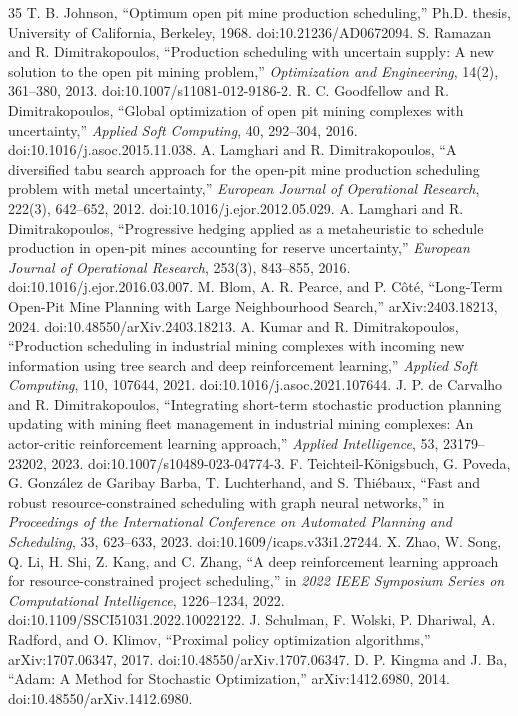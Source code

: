 \documentclass[11pt]{article}
\begin{document}
\begin{thebibliography}{35}
 T. B. Johnson, ``Optimum open pit mine production scheduling,'' Ph.D. thesis, University of California, Berkeley, 1968. doi:10.21236/AD0672094.
 S. Ramazan and R. Dimitrakopoulos, ``Production scheduling with uncertain supply: A new solution to the open pit mining problem,'' \emph{Optimization and Engineering}, 14(2), 361--380, 2013. doi:10.1007/s11081-012-9186-2.
 R. C. Goodfellow and R. Dimitrakopoulos, ``Global optimization of open pit mining complexes with uncertainty,'' \emph{Applied Soft Computing}, 40, 292--304, 2016. doi:10.1016/j.asoc.2015.11.038.
 A. Lamghari and R. Dimitrakopoulos, ``A diversified tabu search approach for the open-pit mine production scheduling problem with metal uncertainty,'' \emph{European Journal of Operational Research}, 222(3), 642--652, 2012. doi:10.1016/j.ejor.2012.05.029.
 A. Lamghari and R. Dimitrakopoulos, ``Progressive hedging applied as a metaheuristic to schedule production in open-pit mines accounting for reserve uncertainty,'' \emph{European Journal of Operational Research}, 253(3), 843--855, 2016. doi:10.1016/j.ejor.2016.03.007.
 M. Blom, A. R. Pearce, and P. C\^ot\'e, ``Long-Term Open-Pit Mine Planning with Large Neighbourhood Search,'' arXiv:2403.18213, 2024. doi:10.48550/arXiv.2403.18213.
 A. Kumar and R. Dimitrakopoulos, ``Production scheduling in industrial mining complexes with incoming new information using tree search and deep reinforcement learning,'' \emph{Applied Soft Computing}, 110, 107644, 2021. doi:10.1016/j.asoc.2021.107644.
 J. P. de Carvalho and R. Dimitrakopoulos, ``Integrating short-term stochastic production planning updating with mining fleet management in industrial mining complexes: An actor-critic reinforcement learning approach,'' \emph{Applied Intelligence}, 53, 23179--23202, 2023. doi:10.1007/s10489-023-04774-3.
 F. Teichteil-K\"onigsbuch, G. Poveda, G. Gonz\'alez de Garibay Barba, T. Luchterhand, and S. Thi\'ebaux, ``Fast and robust resource-constrained scheduling with graph neural networks,'' in \emph{Proceedings of the International Conference on Automated Planning and Scheduling}, 33, 623--633, 2023. doi:10.1609/icaps.v33i1.27244.
 X. Zhao, W. Song, Q. Li, H. Shi, Z. Kang, and C. Zhang, ``A deep reinforcement learning approach for resource-constrained project scheduling,'' in \emph{2022 IEEE Symposium Series on Computational Intelligence}, 1226--1234, 2022. doi:10.1109/SSCI51031.2022.10022122.
 J. Schulman, F. Wolski, P. Dhariwal, A. Radford, and O. Klimov, ``Proximal policy optimization algorithms,'' arXiv:1707.06347, 2017. doi:10.48550/arXiv.1707.06347.
 D. P. Kingma and J. Ba, ``Adam: A Method for Stochastic Optimization,'' arXiv:1412.6980, 2014. doi:10.48550/arXiv.1412.6980.
\end{thebibliography}
\end{document}
